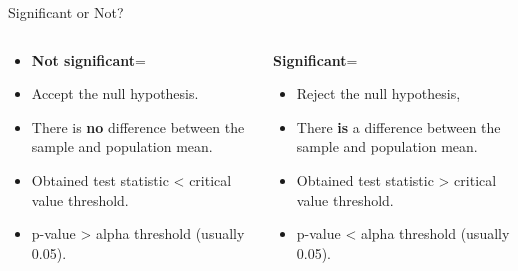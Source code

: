 \documentclass[
  ignorenonframetext,
]{beamer}
\providecommand{\tightlist}{%
  \setlength{\itemsep}{0pt}\setlength{\parskip}{0pt}}
\begin{document}
\begin{frame}{Significant or Not?}
\label{significant-or-not}
\begin{columns}[T]
\begin{column}{0.5\textwidth}
\begin{itemize}
\item
  \textbf{Not significant}= \vspace{1cm}
\item
  Accept the null hypothesis.
\end{itemize}

\begin{itemize}
\tightlist
\item
  There is \textbf{no} difference between the sample and population
  mean.
\end{itemize}

\begin{itemize}
\tightlist
\item
  Obtained test statistic \textless{} critical value threshold.
\end{itemize}

\begin{itemize}
\tightlist
\item
  p-value \textgreater{} alpha threshold (usually 0.05).
\end{itemize}
\end{column}

\begin{column}{0.5\textwidth}
\textbf{Significant}= \vspace{1cm}

\begin{itemize}
\tightlist
\item
  Reject the null hypothesis,
\end{itemize}

\begin{itemize}
\tightlist
\item
  There \textbf{is} a difference between the sample and population mean.
\end{itemize}

\begin{itemize}
\tightlist
\item
  Obtained test statistic \textgreater{} critical value threshold.
\end{itemize}

\begin{itemize}
\tightlist
\item
  p-value \textless{} alpha threshold (usually 0.05).
\end{itemize}
\end{column}
\end{columns}
\end{frame}
\end{document}

